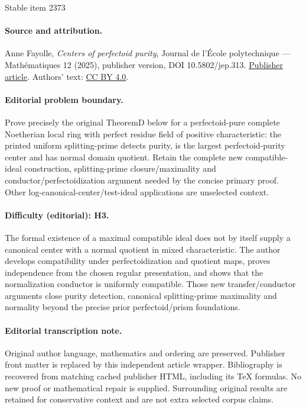 \documentclass[11pt]{article}
\theoremstyle{plain}
\theoremstyle{definition}
\numberwithin{equation}{theorem}
\begin{document}
\begin{center}{\Large Stable item 2373}\end{center}
\paragraph{Source and attribution.}
Anne Fayolle, \emph{Centers of perfectoid purity}, Journal de l’École polytechnique — Mathématiques 12 (2025), publisher version, DOI 10.5802/jep.313. \href{https://jep.centre-mersenne.org/articles/10.5802/jep.313/}{Publisher article}. Authors' text: \href{https://creativecommons.org/licenses/by/4.0/}{CC BY 4.0}.
\paragraph{Editorial problem boundary.}
Prove precisely the original TheoremD below for a perfectoid-pure complete Noetherian local ring with perfect residue field of positive characteristic: the printed uniform splitting-prime detects purity, is the largest perfectoid-purity center and has normal domain quotient. Retain the complete new compatible-ideal construction, splitting-prime closure/maximality and conductor/perfectoidization argument needed by the concise primary proof. Other log-canonical-center/test-ideal applications are unselected context.
\paragraph{Difficulty (editorial): H3.}
The formal existence of a maximal compatible ideal does not by itself supply a canonical center with a normal quotient in mixed characteristic. The author develops compatibility under perfectoidization and quotient maps, proves independence from the chosen regular presentation, and shows that the normalization conductor is uniformly compatible. Those new transfer/conductor arguments close purity detection, canonical splitting-prime maximality and normality beyond the precise prior perfectoid/prism foundations.
\paragraph{Editorial transcription note.}
Original author language, mathematics and ordering are preserved. Publisher front matter is replaced by this independent article wrapper. Bibliography is recovered from matching cached publisher HTML, including its TeX formulas. No new proof or mathematical repair is supplied. Surrounding original results are retained for conservative context and are not extra selected corpus claims.
\clearpage
\end{document}
